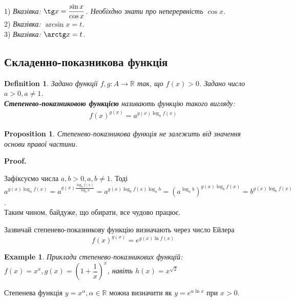 \documentclass[a4paper, 14pt]{article}
\makeatletter
\def\qed{$\blacksquare$}
\theoremstyle{theoremdd}
\theoremstyle{theoremdd}
\newtheorem{definition}[theorem]{Definition}
\theoremstyle{theoremdd}
\theoremstyle{theoremdd}
\newtheorem{example}[theorem]{Example}
\theoremstyle{theoremdd}
\newtheorem{proposition}[theorem]{Proposition}
\theoremstyle{theoremdd}
\theoremstyle{theoremdd}
\theoremstyle{theoremdd}
\renewenvironment{proof}[1][Proof.\\]{\par
\pushQED{\hfill \qed}%
\normalfont \topsep6\p@\@plus6\p@\relax
\trivlist
\item\relax
{\bfseries
#1\@addpunct{.}}\hspace\labelsep\ignorespaces
}{%
\popQED\endtrivlist\@endpefalse
}
\makeatother
\begin{document}
1) \textit{Вказівка: $\tg x = \dfrac{\sin x}{\cos x}$. Необіхдно знати про неперервність $\cos x$.} \\
2) \textit{Вказівка: $\arcsin x = t$.} \\
3) \textit{Вказівка: $\arctg x = t$.}

\subsection{Складенно-показникова функція}
	\begin{definition}
	Задано функції $f,g: A \to \mathbb{R}$ так, що $f(x)>0$. Задано число $a>0, a \neq 1$.\\
	\textbf{Степенево-показниковою функцією} називають функцію такого вигляду:
	\begin{align*}
	f(x)^{g(x)} = a^{g(x) \log_a f(x)}
	\end{align*}
	\end{definition}
	
	\begin{proposition}
	Степенево-показникова функція не залежить від значення основи правої частини.
	\end{proposition}
	
	\begin{proof}
	Зафіксуємо числа $a,b > 0, a,b \neq 1$. Тоді\\
	$a^{g(x) \log_a f(x)} = a^{g(x) \frac{\log_b f(x)}{\log_b a}} = a^{g(x) \log_b f(x) \log_a b} = \left( a^{\log_a b} \right)^{g(x) \log_b f(x)} = b^{g(x) \log_b f(x)}$.\\
	Таким чином, байдуже, що обирати, все чудово працює.
	\end{proof}
	
	Зазвичай степенево-показникову функцію визначають через число Ейлера
	$$ f(x)^{g(x)} = e^{g(x) \ln f(x)} $$
	
	\begin{example}
	Приклади степенево-показникових функцій: $f(x) = x^x, g(x) = \left(1 + \dfrac{1}{x} \right)^x$, навіть $h(x) = x^{\sqrt{2}}$
	\end{example}
	
	Степенева функція $y = x^{\alpha}, \alpha \in \mathbb{R}$ можна визначити як $y = e^{\alpha \ln x}$ при $x > 0$.
\end{document}
